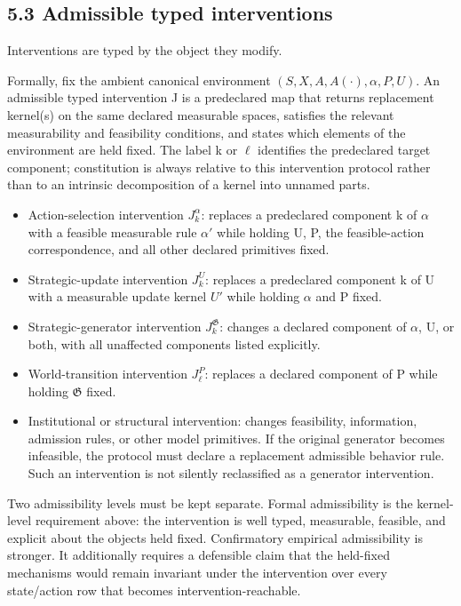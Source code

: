 \documentclass[10pt]{article}
\begin{document}
\subsection{5.3 Admissible typed
interventions}\label{admissible-typed-interventions}

Interventions are typed by the object they modify.

Formally, fix the ambient canonical environment
\((S,X,A,A(\cdot{}),\alpha,P,U)\). An admissible typed intervention J is
a predeclared map that returns replacement kernel(s) on the same
declared measurable spaces, satisfies the relevant measurability and
feasibility conditions, and states which elements of the environment are
held fixed. The label k or \(\ell\) identifies the predeclared target
component; constitution is always relative to this intervention protocol
rather than to an intrinsic decomposition of a kernel into unnamed
parts.

\begin{itemize}
\item
  Action-selection intervention \(J_k^\alpha\): replaces a predeclared
  component k of \(\alpha\) with a feasible measurable rule \(\alpha'\)
  while holding U, P, the feasible-action correspondence, and all other
  declared primitives fixed.
\item
  Strategic-update intervention \(J_k^U\): replaces a predeclared
  component k of U with a measurable update kernel \(U'\) while holding
  \(\alpha\) and P fixed.
\item
  Strategic-generator intervention \(J_k^{\mathfrak G}\): changes a
  declared component of \(\alpha\), U, or both, with all unaffected
  components listed explicitly.
\item
  World-transition intervention \(J_\ell^P\): replaces a declared
  component of P while holding \(\mathfrak G\) fixed.
\item
  Institutional or structural intervention: changes feasibility,
  information, admission rules, or other model primitives. If the
  original generator becomes infeasible, the protocol must declare a
  replacement admissible behavior rule. Such an intervention is not
  silently reclassified as a generator intervention.
\end{itemize}

Two admissibility levels must be kept separate. Formal admissibility is
the kernel-level requirement above: the intervention is well typed,
measurable, feasible, and explicit about the objects held fixed.
Confirmatory empirical admissibility is stronger. It additionally
requires a defensible claim that the held-fixed mechanisms would remain
invariant under the intervention over every state/action row that
becomes intervention-reachable.
\end{document}
